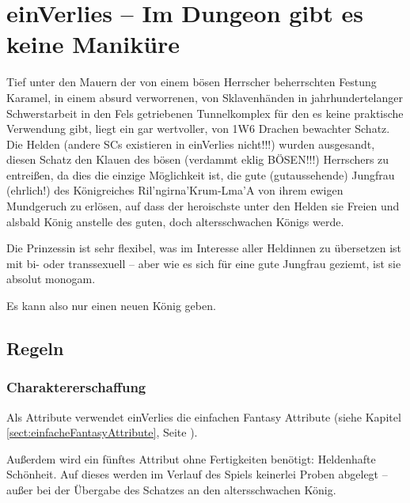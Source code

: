 
\section{einVerlies -- Im Dungeon gibt es keine Maniküre}
\label{sect:einVerlies}
Tief unter den Mauern der von einem bösen Herrscher beherrschten Festung Karamel, in einem absurd verworrenen, von Sklavenhänden in jahrhundertelanger Schwerstarbeit in den Fels getriebenen Tunnelkomplex für den es keine praktische Verwendung gibt, liegt ein gar wertvoller, von 1W6 Drachen bewachter Schatz. Die Helden (andere SCs existieren in einVerlies nicht!!!) wurden ausgesandt, diesen Schatz den Klauen des bösen (verdammt eklig BÖSEN!!!) Herrschers zu entreißen, da dies die einzige Möglichkeit ist, die gute (gutaussehende) Jungfrau (ehrlich!) des Königreiches Ril'ngirna'Krum-Lma'A von ihrem ewigen Mundgeruch zu erlösen, auf dass der heroischste unter den Helden sie Freien und alsbald König anstelle des guten, doch altersschwachen Königs werde.

Die Prinzessin ist sehr flexibel, was im Interesse aller Heldinnen zu übersetzen ist mit bi- oder transsexuell -- aber wie es sich für eine gute Jungfrau geziemt, ist sie absolut monogam.

Es kann also nur einen neuen König geben.

 

\subsection{Regeln}

\subsubsection{Charaktererschaffung}


Als Attribute verwendet einVerlies die einfachen Fantasy Attribute (siehe Kapitel \ref {sect:einfacheFantasyAttribute}, Seite \pageref {sect:einfacheFantasyAttribute}).

Außerdem wird ein fünftes Attribut ohne Fertigkeiten benötigt: Heldenhafte Schönheit. Auf dieses werden im Verlauf des Spiels keinerlei Proben abgelegt -- außer bei der Übergabe des Schatzes an den altersschwachen König.

